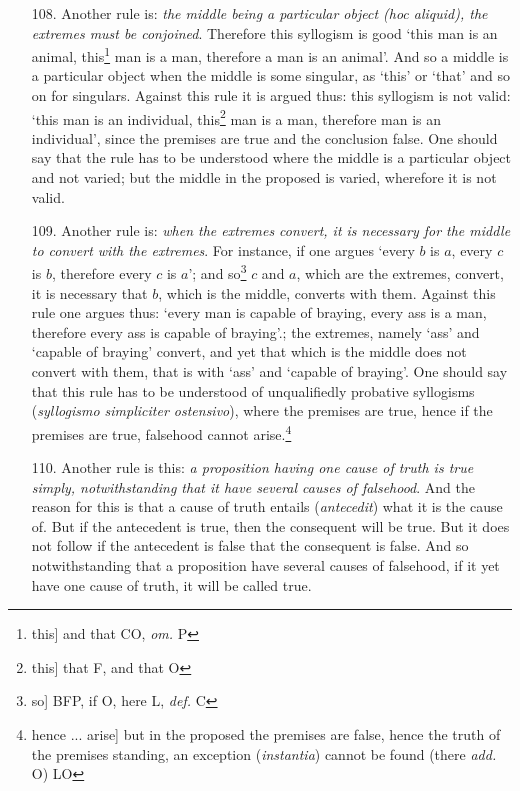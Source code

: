 \begin{itemize}
\item[108.] Another rule is: \textit{the middle being a particular object (hoc aliquid), the extremes must be conjoined}. Therefore this syllogism is good `this man is an animal, this\footnote{this] and that CO, \textit{om.} P} man is a man, therefore a man is an animal'. And so a middle is a particular object when the middle is some singular, as `this' or `that' and so on for singulars. Against this rule it is argued thus: this syllogism is not valid: `this man is an individual, this\footnote{this] that F, and that O} man is a man, therefore man is an individual', since the premises are true and the conclusion false. One should say that the rule has to be understood where the middle is a particular object and not varied; but the middle in the proposed is varied, wherefore it is not valid.
\item[109.] Another rule is: \textit{when the extremes convert, it is necessary for the middle to convert with the extremes}. For instance, if one argues `every $b$ is $a$, every $c$ is $b$, therefore every $c$ is $a$'; and so\footnote{so] BFP, if O, here L, \textit{def.} C} $c$ and $a$, which are the extremes, convert, it is necessary that $b$, which is the middle, converts with them. Against this rule one argues thus: `every man is capable of braying, every ass is a man, therefore every ass is capable of braying'.; the extremes, namely `ass' and `capable of braying' convert, and yet that which is the middle does not convert with them, that is with `ass' and `capable of braying'. One should say that this rule has to be understood of unqualifiedly probative syllogisms (\textit{syllogismo simpliciter ostensivo}), where the premises are true, hence if the premises are true, falsehood cannot arise.\footnote{hence ... arise] but in the proposed the premises are false, hence the truth of the premises standing, an exception (\textit{instantia}) cannot be found (there \textit{add.} O) LO}
\item[110.] Another rule is this: \textit{a proposition having one cause of truth is true simply, notwithstanding that it have several causes of falsehood}. And the reason for this is that a cause of truth entails (\textit{antecedit}) what it is the cause of. But if the antecedent is true, then the consequent will be true. But it does not follow if the antecedent is false that the consequent is false. And so notwithstanding that a proposition have several causes of falsehood, if it yet have one cause of truth, it will be called true.

\end{itemize}
